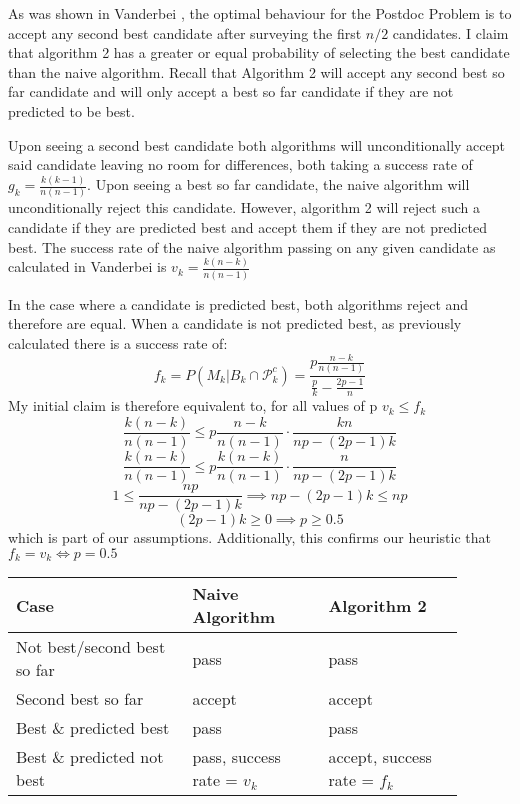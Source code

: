 \documentclass[a4paper,11pt]{article}
\begin{document}
As was shown in Vanderbei \cite{vanderbei2011postdoc}, the optimal behaviour for the Postdoc Problem is to accept any second best candidate after surveying the first $n/2$ candidates. I claim that algorithm 2 has a greater or equal probability of selecting the best candidate than the naive algorithm. Recall that Algorithm 2 will accept any second best so far candidate and will only accept a best so far candidate if they are not predicted to be best. 

Upon seeing a second best candidate both algorithms will unconditionally accept said candidate leaving no room for differences, both taking a success rate of $g_k = \frac{k(k-1)}{n(n-1)}$. Upon seeing a best so far candidate, the naive algorithm will unconditionally reject this candidate. However, algorithm 2 will reject such a candidate if they are predicted best and accept them if they are not predicted best. The success rate of the naive algorithm passing on any given candidate as calculated in Vanderbei is $v_k = \frac{k(n-k)}{n(n-1)}$

In the case where a candidate is predicted best, both algorithms reject and therefore are equal. When a candidate is not predicted best, as previously calculated there is a success rate of:
$$
f_k=P(M_k| B_k\cap \mathcal{P}^c_k ) = \frac{p\frac{n-k}{n(n-1)}}{\frac{p}{k} - \frac{2p-1}{n}}
$$
My initial claim is therefore equivalent to, for all values of p $v_k \le f_k$ 
$$
\frac{k(n-k)}{n(n-1)} \le p\frac{n-k}{n(n-1)}\cdot\frac{kn}{np-(2p-1)k} 
$$
$$
\frac{k(n-k)}{n(n-1)} \le p\frac{k(n-k)}{n(n-1)}\cdot\frac{n}{np-(2p-1)k} 
$$
$$
1\le \frac{np}{np-(2p-1)k}  \implies np-(2p-1)k \le np
$$
$$
(2p-1)k \ge 0 \implies p \ge 0.5
$$
which is part of our assumptions. Additionally, this confirms our heuristic that $f_k = v_k \iff p =0.5$



\begin{tabular}{|p{0.35\linewidth}|p{0.27\linewidth}|p{0.27\linewidth}|}

\hline
Case & Naive Algorithm & Algorithm 2\\
\hline
Not best/second best so far & pass & pass\\
\hline
Second best so far & accept & accept\\
\hline
Best \& predicted best & pass & pass\\
\hline
Best \& predicted not best & pass, success rate = $v_k$ & accept, success rate = $f_k$\\
\hline
\end{tabular}
\end{document}
